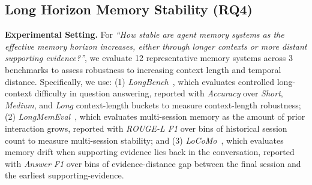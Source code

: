 


\subsection{Long Horizon Memory Stability (RQ4)}
\label{subsec:horizon}

\noindent \textbf{Experimental Setting.}
For \textit{``How stable are agent memory systems as the effective memory horizon increases, either through longer contexts or more distant supporting evidence?''}, we evaluate 12 representative memory systems across 3 benchmarks to assess robustness to increasing context length and temporal distance.
Specifically, we use: (1) \textit{LongBench}~\cite{DBLP:conf/acl/BaiLZL0HDLZHDTL24}, which evaluates controlled long-context difficulty in question answering, reported with \textit{Accuracy} over \textit{Short}, \textit{Medium}, and \textit{Long} context-length buckets to measure context-length robustness;
(2) \textit{LongMemEval}~\cite{wu2024longmemeval}, which evaluates multi-session memory as the amount of prior interaction grows, reported with \textit{ROUGE-L F1} over bins of historical session count to measure multi-session stability; and (3) \textit{LoCoMo}~\cite{maharana2024locomo}, which evaluates memory drift when supporting evidence lies back in the conversation, reported with \textit{Answer F1} over bins of evidence-distance gap between the final session and the earliest supporting-evidence.

